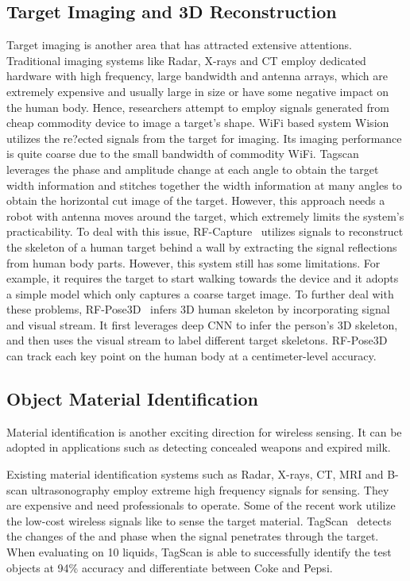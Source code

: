 \subsection{Target Imaging and 3D Reconstruction}

Target imaging is another area that has attracted extensive attentions. Traditional imaging systems like Radar, X-rays and CT employ dedicated
hardware with high frequency, large bandwidth and antenna arrays, which are extremely expensive and usually large in size or have some negative impact on the human body.  Hence, researchers attempt to employ \RF signals generated from cheap commodity device to image a target's shape. WiFi based system Wision~\cite{Huang2014Feasibility} utilizes the re?ected signals from
the target for imaging. Its imaging performance is quite coarse due to the small bandwidth of commodity WiFi. Tagscan~\cite{Tagscan} leverages the phase and amplitude change at each angle to obtain the target width information and stitches together the width information at many angles to obtain the
horizontal cut image of the target. However, this approach needs a robot with antenna moves around the target, which extremely limits the
system's practicability. To deal with this issue, RF-Capture~\cite{Adib2017Capturing} utilizes \FMCW signals to reconstruct the skeleton of
a human target behind a wall by extracting the signal reflections from human body parts. However, this system still has some limitations. For example, it requires the target to start walking towards the device and it adopts a simple model which only captures a coarse target image. To further deal with these problems,
RF-Pose3D~\cite{zhao2018rf} infers 3D human skeleton by incorporating \FMCW signal and visual stream. It first leverages deep CNN to infer
the person's 3D skeleton, and then uses the visual stream to label different target skeletons. RF-Pose3D can track each key point
on the human body at a centimeter-level accuracy.


\subsection{Object Material Identification}
Material identification is another exciting direction for wireless sensing. It can be adopted in
applications such as detecting concealed weapons and expired milk. %

Existing material identification systems such as Radar, X-rays, CT, MRI and B-scan ultrasonography employ extreme high
frequency signals for sensing. They are expensive and need professionals to operate. Some of the recent work utilize the low-cost
wireless signals like \RFID to sense the target material. TagScan~\cite{Tagscan} detects the changes of the
\RSSI and phase when the \RF signal penetrates through the target. When evaluating on 10 liquids, TagScan is able to successfully identify
the test objects at 94\% accuracy and differentiate between Coke and Pepsi.%


